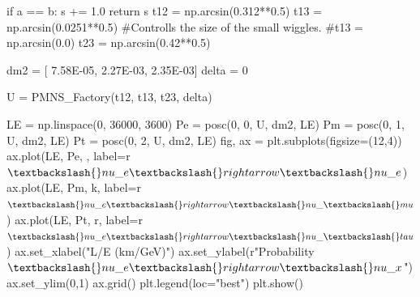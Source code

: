 \documentclass[
  letterpaper,
  DIV=11,
  numbers=noendperiod]{scrreprt}
\newenvironment{Shaded}{\begin{snugshade}}{\end{snugshade}}
\newcommand{\CommentTok}[1]{\textcolor[rgb]{0.37,0.37,0.37}{#1}}
\newcommand{\ControlFlowTok}[1]{\textcolor[rgb]{0.00,0.23,0.31}{#1}}
\newcommand{\DecValTok}[1]{\textcolor[rgb]{0.68,0.00,0.00}{#1}}
\newcommand{\FloatTok}[1]{\textcolor[rgb]{0.68,0.00,0.00}{#1}}
\newcommand{\NormalTok}[1]{\textcolor[rgb]{0.00,0.23,0.31}{#1}}
\newcommand{\OperatorTok}[1]{\textcolor[rgb]{0.37,0.37,0.37}{#1}}
\newcommand{\StringTok}[1]{\textcolor[rgb]{0.13,0.47,0.30}{#1}}
\newcommand{\VerbatimStringTok}[1]{\textcolor[rgb]{0.13,0.47,0.30}{#1}}
\begin{document}
\begin{Shaded}
\begin{Highlighting}[]
    \ControlFlowTok{if}\NormalTok{ a }\OperatorTok{==}\NormalTok{ b: s }\OperatorTok{+=} \FloatTok{1.0}
    \ControlFlowTok{return}\NormalTok{ s}
\NormalTok{t12 }\OperatorTok{=}\NormalTok{ np.arcsin(}\FloatTok{0.312}\OperatorTok{**}\FloatTok{0.5}\NormalTok{)}
\NormalTok{t13 }\OperatorTok{=}\NormalTok{ np.arcsin(}\FloatTok{0.0251}\OperatorTok{**}\FloatTok{0.5}\NormalTok{) }\CommentTok{\#Controlls the size of the small wiggles.}
\CommentTok{\#t13 = np.arcsin(0.0)}
\NormalTok{t23 }\OperatorTok{=}\NormalTok{ np.arcsin(}\FloatTok{0.42}\OperatorTok{**}\FloatTok{0.5}\NormalTok{)}

\NormalTok{dm2 }\OperatorTok{=}\NormalTok{ [ }\FloatTok{7.58E{-}05}\NormalTok{, }\FloatTok{2.27E{-}03}\NormalTok{, }\FloatTok{2.35E{-}03}\NormalTok{]}
\NormalTok{delta }\OperatorTok{=} \DecValTok{0}

\NormalTok{U }\OperatorTok{=}\NormalTok{ PMNS\_Factory(t12, t13, t23, delta)}


\NormalTok{LE }\OperatorTok{=}\NormalTok{ np.linspace(}\DecValTok{0}\NormalTok{, }\DecValTok{36000}\NormalTok{, }\DecValTok{3600}\NormalTok{)}
\NormalTok{Pe }\OperatorTok{=}\NormalTok{ posc(}\DecValTok{0}\NormalTok{, }\DecValTok{0}\NormalTok{, U, dm2, LE)}
\NormalTok{Pm }\OperatorTok{=}\NormalTok{ posc(}\DecValTok{0}\NormalTok{, }\DecValTok{1}\NormalTok{, U, dm2, LE)}
\NormalTok{Pt }\OperatorTok{=}\NormalTok{ posc(}\DecValTok{0}\NormalTok{, }\DecValTok{2}\NormalTok{, U, dm2, LE)}
\NormalTok{fig, ax }\OperatorTok{=}\NormalTok{ plt.subplots(figsize}\OperatorTok{=}\NormalTok{(}\DecValTok{12}\NormalTok{,}\DecValTok{4}\NormalTok{))}
\NormalTok{ax.plot(LE, Pe, }\StringTok{\textquotesingle{}{-}\textquotesingle{}}\NormalTok{, label}\OperatorTok{=}\VerbatimStringTok{r\textquotesingle{}$\textbackslash{}nu\_e \textbackslash{}rightarrow \textbackslash{}nu\_e$\textquotesingle{}}\NormalTok{)}
\NormalTok{ax.plot(LE, Pm, }\StringTok{\textquotesingle{}k\textquotesingle{}}\NormalTok{, label}\OperatorTok{=}\VerbatimStringTok{r\textquotesingle{}$\textbackslash{}nu\_e\textbackslash{}rightarrow\textbackslash{}nu\_\textbackslash{}mu$\textquotesingle{}}\NormalTok{)}
\NormalTok{ax.plot(LE, Pt, }\StringTok{\textquotesingle{}r\textquotesingle{}}\NormalTok{, label}\OperatorTok{=}\VerbatimStringTok{r\textquotesingle{}$\textbackslash{}nu\_e\textbackslash{}rightarrow\textbackslash{}nu\_\textbackslash{}tau$\textquotesingle{}}\NormalTok{)}
\NormalTok{ax.set\_xlabel(}\StringTok{"L/E (km/GeV)"}\NormalTok{)}
\NormalTok{ax.set\_ylabel(}\VerbatimStringTok{r"Probability $\textbackslash{}nu\_e \textbackslash{}rightarrow \textbackslash{}nu\_x$"}\NormalTok{)}
\NormalTok{ax.set\_ylim(}\DecValTok{0}\NormalTok{,}\DecValTok{1}\NormalTok{)}
\NormalTok{ax.grid()}
\NormalTok{plt.legend(loc}\OperatorTok{=}\StringTok{"best"}\NormalTok{)}
\NormalTok{plt.show()}
\end{Highlighting}
\end{Shaded}
\end{document}
